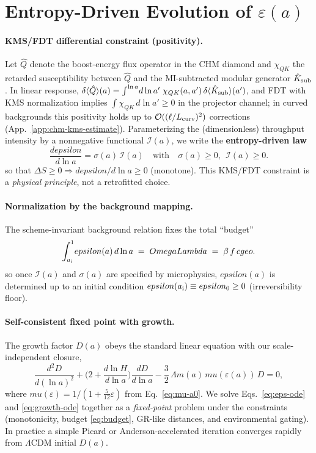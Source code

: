 \documentclass[aps,prd,onecolumn,superscriptaddress,nofootinbib]{revtex4-2}
\def\OmL{OmegaLambda}%
\def\cgeo{cgeo}%
\def\eps{epsilon}%
\def\boxed#1{#1}%
\def\mu{mu}%
\def\Omega_\Lambda{OmegaLambda}%
\providecommand{\OmL}{\Omega_\Lambda}
\providecommand{\cgeo}{c_{\rm geo}}
\providecommand{\eps}{\varepsilon}
\begin{document}
\section{Entropy-Driven Evolution of \texorpdfstring{$\varepsilon(a)$}{epsilon(a)}}
\label{sec:epsilon}
\paragraph{KMS/FDT differential constraint (positivity).}
Let $\hat Q$ denote the boost-energy flux operator in the CHM diamond and $\chi_{QK}$ the retarded susceptibility between $\hat Q$ and the MI-subtracted modular generator $\hat K_{\rm sub}$. In linear response,
$\delta\langle \hat Q\rangle(a) = \int^{\ln a}\! d\ln a' \; \chi_{QK}(a,a')\, \delta\langle \hat K_{\rm sub}\rangle(a')$,
and FDT with KMS normalization implies $\int \chi_{QK}\,d\ln a'\ge 0$ in the projector channel; in curved backgrounds this positivity holds up to $\mathcal O((\ell/L_{\rm curv})^2)$ corrections (App.~\ref{app:chm-kms-estimate}).
Parameterizing the (dimensionless) throughput intensity by a nonnegative functional $\mathcal I(a)$, we write the \textbf{entropy-driven law}
\begin{equation}
\label{eq:eps-ode}
\boxed{\frac{d\eps}{d\ln a} = \sigma(a)\,\mathcal I(a)\quad\text{with}\quad \sigma(a)\ge 0,\ \ \mathcal I(a)\ge 0.}
\end{equation}
so that $\Delta S\ge 0\Rightarrow d\eps/d\ln a\ge 0$ (monotone). This KMS/FDT constraint is a \emph{physical principle}, not a retrofitted choice.

\paragraph{Normalization by the background mapping.}
The scheme-invariant background relation fixes the total ``budget''
\begin{equation}
\label{eq:budget}
\boxed{\int_{a_{\rm i}}^{1}\!\eps(a)\, d\ln a \;=\; \OmL \;=\; \beta\, f\, \cgeo.}
\end{equation}
so once $\mathcal I(a)$ and $\sigma(a)$ are specified by microphysics, $\eps(a)$ is determined up to an initial condition $\eps(a_{\rm i})\equiv \eps_0\ge 0$ (irreversibility floor).

\paragraph{Self-consistent fixed point with growth.}
The growth factor $D(a)$ obeys the standard linear equation with our scale-independent closure,
\begin{equation}
\label{eq:growth-ode}
\frac{d^2 D}{d(\ln a)^2}
+\Big(2+\frac{d\ln H}{d\ln a}\Big)\frac{dD}{d\ln a}
-\frac{3}{2}\,\Omega_m(a)\,\mu(\varepsilon(a))\,D=0,
\end{equation}
where $\mu(\varepsilon)=1/(1+\tfrac{5}{12}\varepsilon)$ from Eq.~\eqref{eq:mu-a0}. We solve Eqs.~\eqref{eq:eps-ode} and \eqref{eq:growth-ode} together as a \emph{fixed-point} problem under the constraints (monotonicity, budget \eqref{eq:budget}, GR-like distances, and environmental gating). In practice a simple Picard or Anderson-accelerated iteration converges rapidly from $\Lambda$CDM initial $D(a)$.
\end{document}
